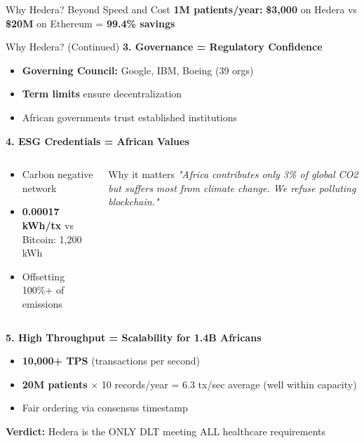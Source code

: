 \documentclass[aspectratio=169,xcolor=dvipsnames,20pt]{beamer}
\newcommand{\checkitem}{\item[\color{SuccessGreen}\faCheckCircle]}
\begin{document}
\begin{frame}[shrink=10]{Why Hedera? Beyond Speed and Cost}
  \small
  \textbf{1M patients/year:} \textcolor{SuccessGreen}{\textbf{\$3,000}} on Hedera vs \textcolor{DangerRed}{\textbf{\$20M}} on Ethereum = \textbf{99.4\% savings}

\end{frame}

\begin{frame}[shrink=5]{Why Hedera? (Continued)}
\small
  \textbf{\textcolor{HederaPurple}{3. Governance = Regulatory Confidence}}

  \begin{itemize}
    \checkitem \textbf{Governing Council:} Google, IBM, Boeing (39 orgs)
    \checkitem \textbf{Term limits} ensure decentralization
    \checkitem African governments trust established institutions
  \end{itemize}

  \vspace{0.2cm}

  \textbf{\textcolor{HederaPurple}{4. ESG Credentials = African Values}}

  \begin{columns}[T]
    \begin{column}{0.5\textwidth}
      \begin{itemize}
        \checkitem \textcolor{SuccessGreen}{Carbon negative} network
        \checkitem \textbf{0.00017 kWh/tx} vs Bitcoin: 1,200 kWh
        \checkitem Offsetting 100\%+ of emissions
      \end{itemize}
    \end{column}

    \begin{column}{0.5\textwidth}
      \begin{block}{Why it matters}
        \textit{"Africa contributes only 3\% of global CO2 but suffers most from climate change. We refuse polluting blockchain."}
      \end{block}
    \end{column}
  \end{columns}

  \vspace{0.3cm}

  \textbf{\textcolor{HederaPurple}{5. High Throughput = Scalability for 1.4B Africans}}

  \begin{itemize}
    \checkitem \textbf{10,000+ TPS} (transactions per second)
    \checkitem \textbf{20M patients} × 10 records/year = 6.3 tx/sec average (well within capacity)
    \checkitem Fair ordering via consensus timestamp
  \end{itemize}

  \vspace{0.3cm}

  \begin{center}
    \Large{\textbf{Verdict:} \textcolor{HederaPurple}{Hedera is the ONLY DLT meeting ALL healthcare requirements}}
  \end{center}

\end{frame}
\end{document}
